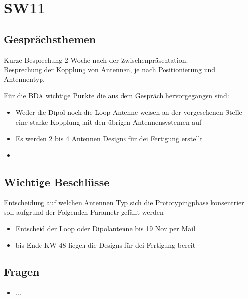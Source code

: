\documentclass[10pt,a4paper]{article}
\begin{document}
\section*{SW11}

\subsection*{Gesprächsthemen}

Kurze Besprechung 2 Woche nach der Zwischenpräsentation.\\
Besprechung der Kopplung von Antennen, je nach Positionierung und Antennentyp.

\vspace{10 mm}
Für die BDA wichtige Punkte die aus dem Gespräch hervorgegangen sind:
\begin{itemize}
	\item Weder die Dipol noch die Loop Antenne weisen an der vorgesehenen Stelle eine starke Kopplung mit den übrigen Antennensystemen auf
	\item Es werden 2 bis 4 Antennen Designs für dei Fertigung erstellt
	\item 
	
\end{itemize}

\subsection*{Wichtige Beschlüsse}
Entscheidung auf welchen Antennen Typ sich die Prototypingphase konsentrier soll aufgrund der Folgenden Parametr gefällt werden
\begin{itemize}
	\item Entscheid der Loop oder Dipolantenne bis 19 Nov per Mail
	\item bis Ende KW 48 liegen die Designs für dei Fertigung bereit
\end{itemize}
\subsection*{Fragen}
\begin{itemize}
	\item ...
\end{itemize}
\end{document}
